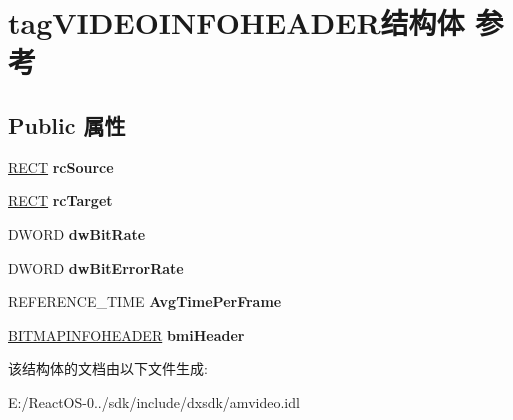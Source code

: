 \hypertarget{structtag_v_i_d_e_o_i_n_f_o_h_e_a_d_e_r}{}\section{tag\+V\+I\+D\+E\+O\+I\+N\+F\+O\+H\+E\+A\+D\+E\+R结构体 参考}
\label{structtag_v_i_d_e_o_i_n_f_o_h_e_a_d_e_r}
\subsection*{Public 属性}
\begin{DoxyCompactItemize}
\item 
\mbox{\label{structtag_v_i_d_e_o_i_n_f_o_h_e_a_d_e_r_acb54b261c356377a188eead0f1a53a6b}} 
\hyperlink{structtag_r_e_c_t}{R\+E\+CT} {\bfseries rc\+Source}
\item 
\mbox{\label{structtag_v_i_d_e_o_i_n_f_o_h_e_a_d_e_r_aee976fe81f30a394666d83025ae75c08}} 
\hyperlink{structtag_r_e_c_t}{R\+E\+CT} {\bfseries rc\+Target}
\item 
\mbox{\label{structtag_v_i_d_e_o_i_n_f_o_h_e_a_d_e_r_a64357c9528ea161890f6b7d2ba7bb564}} 
D\+W\+O\+RD {\bfseries dw\+Bit\+Rate}
\item 
\mbox{\label{structtag_v_i_d_e_o_i_n_f_o_h_e_a_d_e_r_a61e228014969dfd9ebac138e73cda3d7}} 
D\+W\+O\+RD {\bfseries dw\+Bit\+Error\+Rate}
\item 
\mbox{\label{structtag_v_i_d_e_o_i_n_f_o_h_e_a_d_e_r_a6d6a1fda0877d4ba6ce1ad72eebdcb93}} 
R\+E\+F\+E\+R\+E\+N\+C\+E\+\_\+\+T\+I\+ME {\bfseries Avg\+Time\+Per\+Frame}
\item 
\mbox{\label{structtag_v_i_d_e_o_i_n_f_o_h_e_a_d_e_r_a3a78d82a15b5bf627022ff00ffacf54c}} 
\hyperlink{struct_b_i_t_m_a_p_i_n_f_o_h_e_a_d_e_r}{B\+I\+T\+M\+A\+P\+I\+N\+F\+O\+H\+E\+A\+D\+ER} {\bfseries bmi\+Header}
\end{DoxyCompactItemize}


该结构体的文档由以下文件生成\+:\begin{DoxyCompactItemize}
\item 
E\+:/\+React\+O\+S-\/0../sdk/include/dxsdk/amvideo.\+idl\end{DoxyCompactItemize}
